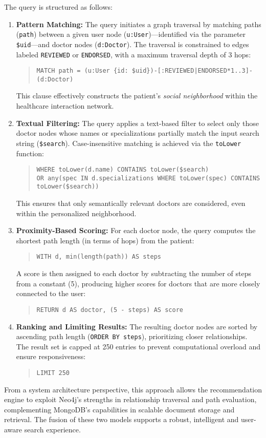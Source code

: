 The query is structured as follows:
\begin{enumerate}
	\item \textbf{Pattern Matching:} 
	The query initiates a graph traversal by matching paths (\texttt{path}) between a given user node (\texttt{u:User})—identified via the parameter \texttt{\$uid}—and doctor nodes (\texttt{d:Doctor}). The traversal is constrained to edges labeled \texttt{REVIEWED} or \texttt{ENDORSED}, with a maximum traversal depth of 3 hops:
	\begin{quote}
		\texttt{MATCH path = (u:User \{id: \$uid\})-[:REVIEWED|ENDORSED*1..3]-(d:Doctor)}
	\end{quote}
	This clause effectively constructs the patient's \textit{social neighborhood} within the healthcare interaction network.
	
	\item \textbf{Textual Filtering:}
	The query applies a text-based filter to select only those doctor nodes whose names or specializations partially match the input search string (\texttt{\$search}). Case-insensitive matching is achieved via the \texttt{toLower} function:
	\begin{quote}
		\texttt{WHERE toLower(d.name) CONTAINS toLower(\$search)}\\
		\texttt{OR any(spec IN d.specializations WHERE toLower(spec) CONTAINS toLower(\$search))}
	\end{quote}
	This ensures that only semantically relevant doctors are considered, even within the personalized neighborhood.
	
	\item \textbf{Proximity-Based Scoring:}
	For each doctor node, the query computes the shortest path length (in terms of hops) from the patient:
	\begin{quote}
		\texttt{WITH d, min(length(path)) AS steps}
	\end{quote}
	A score is then assigned to each doctor by subtracting the number of steps from a constant (5), producing higher scores for doctors that are more closely connected to the user:
	\begin{quote}
		\texttt{RETURN d AS doctor, (5 - steps) AS score}
	\end{quote}
	
	\item \textbf{Ranking and Limiting Results:}
	The resulting doctor nodes are sorted by ascending path length (\texttt{ORDER BY steps}), prioritizing closer relationships. The result set is capped at 250 entries to prevent computational overload and ensure responsiveness:
	\begin{quote}
		\texttt{LIMIT 250}
	\end{quote}
\end{enumerate}

From a system architecture perspective, this approach allows the recommendation engine to exploit Neo4j's strengths in relationship traversal and path evaluation, complementing MongoDB's capabilities in scalable document storage and retrieval. The fusion of these two models supports a robust, intelligent and user-aware search experience.